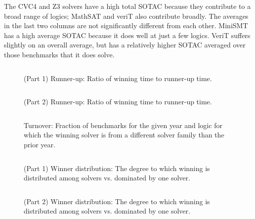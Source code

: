 \documentclass[smallcondensed]{svjour3}
\begin{document}
\begin{itemize}
The CVC4 and Z3 solvers have a high total SOTAC because they contribute to a broad range of logics; MathSAT and veriT also contribute broadly. The averages in the last two columns are not significantly different from each other. MiniSMT has a high average SOTAC because it does well at just a few logics. VeriT suffers slightly on an overall average, but has a relatively higher SOTAC averaged over those benchmarks that it does solve.

\end{itemize}

\begin{figure}
\centering
\begin{tabular}{|ll|r|rrrr|}
\hline

\end{tabular}
\caption{(Part 1) Runner-up: Ratio of winning time to runner-up time.}
\label{Fig:runnerup1}
\end{figure}

\begin{figure}
\centering
\begin{tabular}{|ll|r|rrrr|}
\hline

\end{tabular}
\caption{(Part 2) Runner-up: Ratio of winning time to runner-up time.}
\label{Fig:runnerup2}
\end{figure}


\begin{figure}
\centering
\begin{tabular}{|l|rrr|p{.3in}|l|rrr|}
\hline

\hline
\end{tabular}
\vspace{.2in}
\caption{Turnover: Fraction of benchmarks for the given year and logic for which the winning solver is from a different solver family than the prior year.}
\label{Fig:turnover}
\end{figure}


\begin{figure}
\centering
\begin{tabular}{|ll|ccrrr|}
\hline

\end{tabular}
\caption{(Part 1) Winner distribution: The degree to which winning is distributed among solvers vs. dominated by one solver.}
\label{Fig:entropyA}
\end{figure}

\begin{figure}
\centering
\begin{tabular}{|ll|ccrrr|}
\hline

\end{tabular}
\caption{(Part 2) Winner distribution: The degree to which winning is distributed among solvers vs. dominated by one solver.}
\label{Fig:entropyB}
\end{figure}
\end{document}
